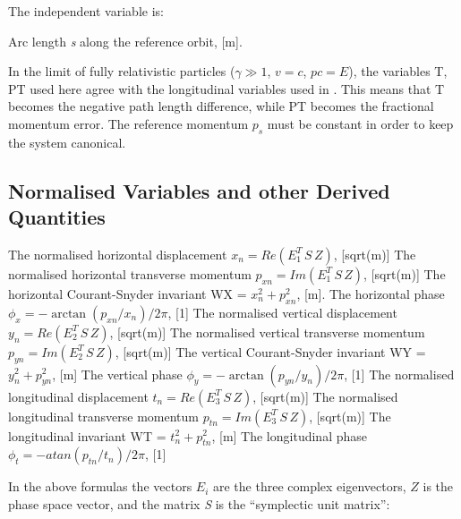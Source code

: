 The independent variable is: 
\begin{madlist}
    Arc length \textit{s} along the reference orbit, [m].   
\end{madlist} 

In the limit of fully relativistic particles ($\gamma \gg 1$, $v = c$,
$p c = E$), the variables T, PT used here agree with the
longitudinal variables used in \cite{TRANSPORT}. This means that T
becomes the negative path length difference, while PT becomes the
fractional momentum error. The reference momentum $p_s$ must be
constant in order to keep the system canonical.  

\subsection{Normalised Variables and other Derived Quantities}
\label{subsec:tables_normal}
\begin{madlist}
   The normalised horizontal displacement \quad
  $x_n = Re ( E_1^T \, S\, Z )$, [sqrt(m)]
   The normalised horizontal transverse momentum \quad
  $p_{xn} = Im ( E_1^T\, S\, Z )$, [sqrt(m)]
   The horizontal Courant-Snyder invariant \quad
  WX = $x_n^2 + p_{xn}^2$, [m].    
   The horizontal phase \quad
  $\phi_x = -\arctan ( p_{xn} / x_n ) / 2 \pi$, [1]
   The normalised vertical displacement \quad 
  $y_n = Re ( E_2^T \,S\, Z )$, [sqrt(m)]
   The normalised vertical transverse momentum \quad
  $p_{yn} = Im ( E_2^T\, S\, Z )$, [sqrt(m)]
   The vertical Courant-Snyder invariant \quad
  WY = $y_n^2 + p_{yn}^2$, [m]
   The vertical phase \quad
  $\phi_y = - \arctan ( p_{yn} / y_n ) / 2 \pi$, [1]
   The normalised longitudinal displacement \quad
  $t_n = Re ( E_3^T \,S\, Z )$, [sqrt(m)]
   The normalised longitudinal transverse momentum \quad
  $p_{tn} = Im ( E_3^T\, S\, Z )$, [sqrt(m)]
   The longitudinal invariant \quad
  WT = $t_n^2 + p_{tn}^2$, [m]
   The longitudinal phase \quad
  $\phi_t = - atan ( p_{tn} / t_n ) / 2 \pi$, [1]
\end{madlist} 

In the above formulas the vectors \(E_i\) are the three complex
eigenvectors, \(Z\) is the phase space vector, and the matrix \textit{S}
is the ``symplectic unit matrix'':   

